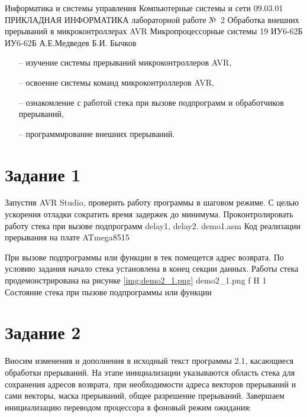\documentclass{bmstu}
\makeatletter
\renewcommand\chapter{\par%
\thispagestyle{plain}%
\@afterindentfalse \secdef\@chapter\@schapter}
\makeatother
\begin{document}
\makereporttitle
    {Информатика и системы управления} %
    {Компьютерные системы и сети} %
    {09.03.01 ПРИКЛАДНАЯ ИНФОРМАТИКА} %
    {лабораторной работе №~2} %
    {Обработка внешних прерываний в микроконтроллерах AVR} %
    {Микропроцессорные системы} %
    {19} %
    {ИУ6-62Б} %
    {
    	{ИУ6-62Б}
    	{А.Е.Медведев} %
    	{Б.И. Бычков} %
    } 
    
\chapter{Цель работы:}
\begin{itemize}
\item[--] изучение системы прерываний микроконтроллеров AVR,
\item[--] освоение системы команд микроконтроллеров AVR,
\item[--] ознакомление с работой стека при вызове подпрограмм и обработчиков прерываний,
\item[--] программирование внешних прерываний.  
\end{itemize}

\chapter{Задания:}
\section{Задание 1}
Запустив AVR Studio, проверить работу программы в шаговом режиме. С целью ускорения отладки сократить время задержек до минимума. Проконтролировать работу стека при вызове подпрограмм delay1, delay2.
	{demo1.asm}
	{Код реализации прерывания на плате ATmega8515}

При вызове подпрограммы или функции в тек помещется адрес возврата. По условию задания начало стека установлена в конец секции данных. Работы стека продемонстрирована на рисунке \ref{img:demo2_1.png}
    {demo2_1.png} %
    {f} %
    {H} %
    {1\textwidth} %
    {Состояние стека при пызове подпрограммы или функции} 


\section{Задание 2}
Вносим изменения  и дополнения в исходный текст программы 2.1, касающиеся обработки прерываний. На этапе инициализации указываются область стека для сохранения адресов возврата, при необходимости адреса векторов прерываний и сами векторы, маска прерываний, общее разрешение прерываний. Завершаем инициализацию переводом процессора в фоновый режим ожидания:
\end{document}
